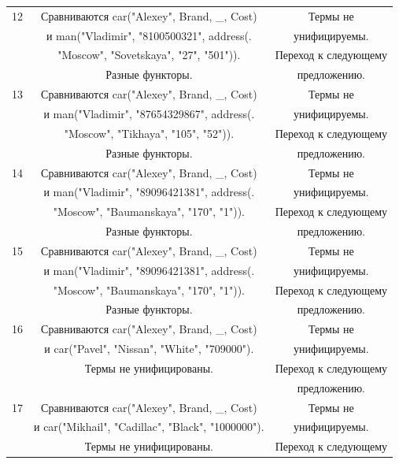 \documentclass[12pt]{report}
\begin{document}
\begin{table}[H]
	\begin{center}
		\begin{tabular}{|c c c |} 
			\hline
			12 & Сравниваются car("Alexey"{}, Brand, \_, Cost) & Термы не \\
			  & и man("Vladimir"{}, "8100500321"{}, address(. & унифицируемы. \\
			  & "Moscow"{}, "Sovetskaya"{}, "27"{}, "501"{})).  & Переход к следующему \\
			  & Разные функторы. & предложению. \\
			\hline
			13 & Сравниваются car("Alexey"{}, Brand, \_, Cost) & Термы не \\
			  & и man("Vladimir"{}, "87654329867"{}, address(. & унифицируемы. \\
			  & "Moscow"{}, "Tikhaya"{}, "105"{}, "52"{})).  & Переход к следующему \\
			  & Разные функторы. & предложению. \\
			\hline
			14 & Сравниваются car("Alexey"{}, Brand, \_, Cost) & Термы не \\
			  & и man("Vladimir"{}, "89096421381"{}, address(. & унифицируемы. \\
			  & "Moscow"{}, "Baumanskaya"{}, "170"{}, "1"{})).  & Переход к следующему \\
			  & Разные функторы. & предложению. \\
			\hline
			15 & Сравниваются car("Alexey"{}, Brand, \_, Cost) & Термы не \\
			   & и man("Vladimir"{}, "89096421381"{}, address(. & унифицируемы. \\
			   & "Moscow"{}, "Baumanskaya"{}, "170"{}, "1"{})).  & Переход к следующему \\
		       & Разные функторы. & предложению. \\
			\hline
			16 & Сравниваются car("Alexey"{}, Brand, \_, Cost) & Термы не \\
			  & и car("Pavel"{}, "Nissan"{}, "White"{}, "709000"{}). & унифицируемы. \\
			  & Термы не унифицированы.  & Переход к следующему \\
			  &  & предложению. \\
			\hline
			17 & Сравниваются car("Alexey"{}, Brand, \_, Cost) & Термы не \\
			  & и car("Mikhail"{}, "Cadillac"{}, "Black"{}, "1000000"{}). & унифицируемы. \\
			  & Термы не унифицированы.  & Переход к следующему \\

\end{tabular}
\end{center}
\end{table}
\end{document}
